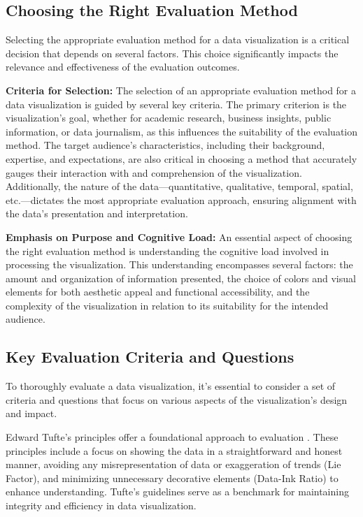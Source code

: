 \subsection{Choosing the Right Evaluation Method}
Selecting the appropriate evaluation method for a data visualization is a critical decision that depends on several factors. This choice significantly impacts the relevance and effectiveness of the evaluation outcomes.

\textbf{Criteria for Selection:}
The selection of an appropriate evaluation method for a data visualization is guided by several key criteria. The primary criterion is the visualization's goal, whether for academic research, business insights, public information, or data journalism, as this influences the suitability of the evaluation method. The target audience's characteristics, including their background, expertise, and expectations, are also critical in choosing a method that accurately gauges their interaction with and comprehension of the visualization. Additionally, the nature of the data—quantitative, qualitative, temporal, spatial, etc.—dictates the most appropriate evaluation approach, ensuring alignment with the data's presentation and interpretation.

\textbf{Emphasis on Purpose and Cognitive Load:}
An essential aspect of choosing the right evaluation method is understanding the cognitive load involved in processing the visualization. This understanding encompasses several factors: the amount and organization of information presented, the choice of colors and visual elements for both aesthetic appeal and functional accessibility, and the complexity of the visualization in relation to its suitability for the intended audience.

\subsection{Key Evaluation Criteria and Questions}
To thoroughly evaluate a data visualization, it's essential to consider a set of criteria and questions that focus on various aspects of the visualization's design and impact.

Edward Tufte’s principles offer a foundational approach to evaluation \cite{tufteVisualDisplayQuantitative2015, borkinWhatMakesVisualization2013a}. These principles include a focus on showing the data in a straightforward and honest manner, avoiding any misrepresentation of data or exaggeration of trends (Lie Factor), and minimizing unnecessary decorative elements (Data-Ink Ratio) to enhance understanding. Tufte's guidelines serve as a benchmark for maintaining integrity and efficiency in data visualization.

